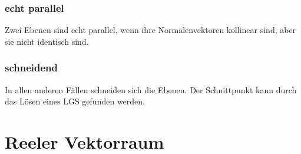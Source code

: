 \documentclass{article}
\begin{document}
\begin{minipage}[t]{0.45\textwidth}
    \subsubsection*{echt parallel}
    Zwei Ebenen sind echt parallel, wenn ihre Normalenvektoren kollinear sind, aber sie nicht identisch sind.
    
    \subsubsection*{schneidend}
    In allen anderen Fällen schneiden sich die Ebenen. Der Schnittpunkt kann durch das Lösen eines LGS gefunden werden.
\end{minipage}

\section*{Reeler Vektorraum}
\end{document}
